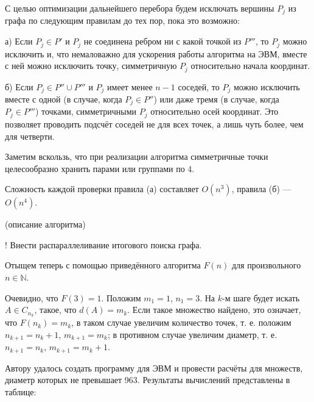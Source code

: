 \documentclass{article}
\begin{document}
С целью оптимизации дальнейшего перебора будем исключать вершины $P_j$ из графа по следующим правилам до тех пор, пока это возможно:

а) Если $P_j \in P'$ и $P_j$ не соединена ребром ни с какой точкой из $P'''$, то $P_j$ можно исключить и, что немаловажно для ускорения работы алгоритма на ЭВМ, вместе с ней можно исключить точку, симметричную $P_j$ относительно начала координат.

б) Если $P_j \in P'' \cup P'''$ и $P_j$ имеет менее $n-1$ соседей, то $P_j$ можно исключить вместе с одной (в случае, когда $P_j \in P''$) или даже тремя (в случае, когда $P_j \in P'''$) точками, симметричными $P_j$ относительно осей координат.
Это позволяет проводить подсчёт соседей не для всех точек, а лишь чуть более, чем для четверти.


Заметим вскользь, что при реализации алгоритма симметричные точки целесообразно хранить парами или группами по 4.

Сложность каждой проверки правила (а) составляет $O(n^3)$, правила (б) --- $O(n^4)$.





(описание алгоритма)


! Внести распараллеливание итогового поиска графа.


Отыщем теперь с помощью приведённого алгоритма $F(n)$ для произвольного $n \in \mathbb{N}$.

Очевидно, что $F(3) = 1$.
Положим $m_1=1$, $n_1=3$.
На $k$-м шаге будет искать $A \in C_{n_k}$, такое, что $d(A) = m_k$.
Если такое множество найдено, это означает, что $F(n_k)=m_k$,
в таком случае увеличим количество точек, т. е. положим $n_{k+1} = n_k +1$, $m_{k+1} = m_k$;
в противном случае увеличим диаметр, т. е. $n_{k+1} = n_k$, $m_{k+1} = m_k +1$.


Автору удалось создать программу для ЭВМ и провести расчёты для множеств, диаметр которых не превышает 963.
Результаты вычислений представлены в таблице:
\end{document}

